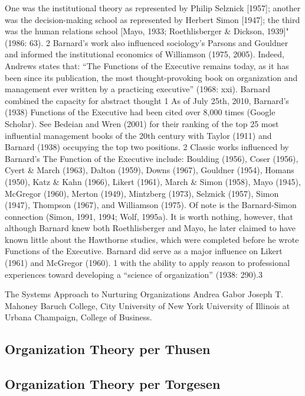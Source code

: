 One was the institutional theory as represented by Philip Selznick [1957]; another was the decision-making school as represented by Herbert Simon [1947]; the third was the human relations school [Mayo, 1933; Roethlisberger \& Dickson, 1939]" (1986: 63). 2 Barnard’s work also influenced sociology’s Parsons and Gouldner and informed the institutional economics of Williamson (1975, 2005). Indeed, Andrews states that: ``The Functions of the Executive remains today, as it has been since its publication, the most thought-provoking book on organization and management ever written by a practicing executive'' (1968: xxi). Barnard combined the capacity for abstract thought 1 As of July 25th, 2010, Barnard’s (1938) Functions of the Executive had been cited over 8,000 times (Google Scholar). See Bedeian and Wren (2001) for their ranking of the top 25 most influential management books of the 20th century with Taylor (1911) and Barnard (1938) occupying the top two positions. 2 Classic works influenced by Barnard’s The Function of the Executive include: Boulding (1956), Coser (1956), Cyert \& March (1963), Dalton (1959), Downs (1967), Gouldner (1954), Homans (1950), Katz \& Kahn (1966), Likert (1961), March \& Simon (1958), Mayo (1945), McGregor (1960), Merton (1949), Mintzberg (1973), Selznick (1957), Simon (1947), Thompson (1967), and Williamson (1975). Of note is the Barnard-Simon connection (Simon, 1991, 1994; Wolf, 1995a). It is worth nothing, however, that although Barnard knew both Roethlisberger and Mayo, he later claimed to have known little about the Hawthorne studies, which were completed before he wrote Functions of the Executive. Barnard did serve as a major influence on Likert (1961) and McGregor (1960). 1 with the ability to apply reason to professional experiences toward developing a ``science of organization'' (1938: 290).3

The Systems Approach to Nurturing Organizations Andrea Gabor Joseph T. Mahoney Baruch College, City University of New York University of Illinois at Urbana Champaign, College of Business.
    
\subsection{Organization Theory per Thusen}

\subsection{Organization Theory per Torgesen}

